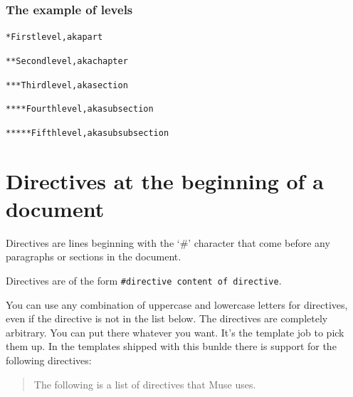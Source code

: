 \documentclass[DIV=12,%
               BCOR=0mm,%
               fontsize=10pt,%
               oneside,%
               paper=210mm:11in]{scrbook}
\begin{document}
\subsection{The example of levels}


\begin{alltt}
* First level, aka part

** Second level, aka chapter

*** Third level, aka section

**** Fourth level, aka subsection

***** Fifth level, aka subsubsection

\end{alltt}

\chapter{Directives at the beginning of a document}


Directives are lines beginning with the `\#' character that come before
any paragraphs or sections in the document.


Directives are of the form \texttt{\#directive content of directive}.


You can use any combination of uppercase and lowercase letters for
directives, even if the directive is not in the list below. The
directives are completely arbitrary. You can put there whatever you
want. It's the template job to pick them up. In the templates shipped
with this bunlde there is support for the following directives:



\begin{quote}


The following is a list of directives that Muse uses.



\end{quote}
\end{document}
